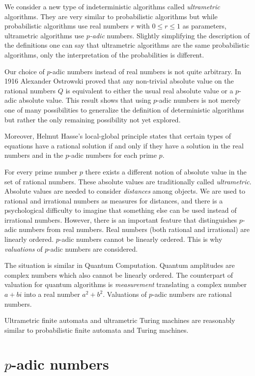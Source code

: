 \documentclass{llncs}
\begin{document}
We consider a new type of indeterministic algorithms called {\em ultrametric} algorithms. They are very similar to probabilistic algorithms but while probabilistic algorithms use real numbers $r$ with $0 \leq r \leq 1$ as parameters, ultrametric algorithms use {\em $p$-adic} numbers.
Slightly simplifying the description of the definitions one can say that ultrametric algorithms are the same probabilistic algorithms, only the interpretation of the probabilities is different. 

Our choice of $p$-adic numbers instead of real numbers is not quite arbitrary. In 1916 Alexander Ostrowski 
proved that any non-trivial absolute value on the rational numbers $Q$ is equivalent to either the usual real absolute value or a $p$-adic absolute value.
This result shows that using $p$-adic numbers is not merely one of many possibilities to generalize the definition of deterministic algorithms but rather the only remaining possibility not yet explored.

Moreover, Helmut Hasse's local-global principle
 states that certain types of equations have a rational solution if and only if they have a solution in the real numbers and in the $p$-adic numbers for each prime $p$.

For every prime number $p$ there exists a different notion of absolute value in the set of rational numbers. These absolute values are traditionally  called {\em ultrametric}. 
Absolute values are needed to consider {\em distances} among objects. We are used to rational and irrational numbers as measures for distances, and there is a psychological difficulty to imagine that something else can be used instead of irrational numbers.
However, there is an important feature that distinguishes $p$-adic numbers from real numbers. Real numbers (both rational and irrational) are linearly ordered.
$p$-adic numbers cannot be linearly ordered. This is why {\em valuations} of $p$-adic numbers are considered. 

The situation is similar in Quantum Computation. Quantum amplitudes are complex numbers which also cannot be linearly ordered. The counterpart of valuation for quantum algorithms is {\em measurement} translating a complex number $a + bi$ into a real number $a^2 + b^2$. Valuations of $p$-adic numbers are rational numbers.

Ultrametric finite automata and ultrametric Turing machines are reasonably similar to probabilistic finite automata and Turing machines. 

\section{$p$-adic numbers}
\end{document}
